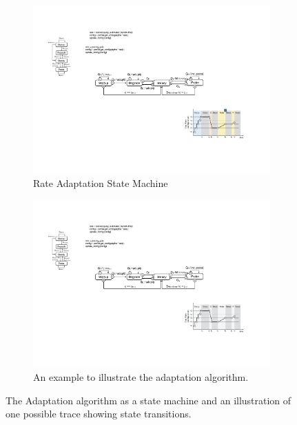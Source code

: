 \begin{figure}
  \begin{subfigure}[t]{\columnwidth}
    \centering
    \includegraphics[width=\columnwidth]{figures/cc.pdf}
    \caption{Rate Adaptation State Machine}
    \vspace{1em}
    \label{fig:cc-sm}
  \end{subfigure}
  \begin{subfigure}[t]{0.9\columnwidth}
    \centering
    \includegraphics[width=\columnwidth]{figures/cc2.pdf}
    \caption{An example to illustrate the adaptation algorithm.}
    \label{fig:cc-ex}
  \end{subfigure}

  \caption{The Adaptation algorithm as a state machine and an illustration of
    one possible trace showing state transitions.}
  \label{fig:cc}
\end{figure}

